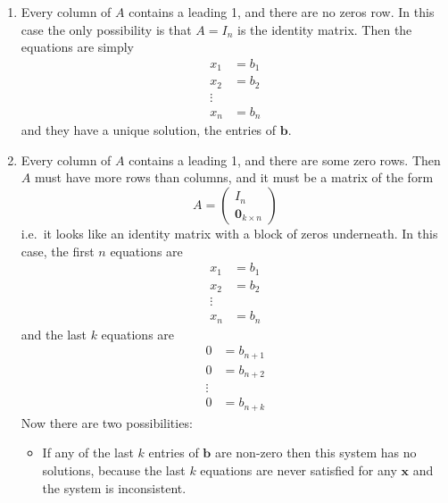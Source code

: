 \documentclass[12pt]{report}
\theoremstyle{definition}
\begin{document}
\begin{enumerate}[label = (\arabic*)]
    \item Every column of $A$ contains a leading 1, and there are no zeros row.
        In this case the only possibility is that $A = I_n$ is the identity matrix.
        Then the equations are simply\[
            \begin{align*}
                x_1 & = b_1 \\
                x_2 & = b_2 \\
                \vdots \\
                x_n & = b_n 
            \end{align*}
        \]
        and they have a unique solution, the entries of $\mathbf{b}$.

    \item Every column of $A$ contains a leading 1, and there are some zero rows.
        Then $A$ must have more rows than columns, and it must be a matrix of the form\[
            A = 
            \begin{pmatrix}
                  I_n \\
                  \mathbf{0}_{k \times n}
            \end{pmatrix} 
        \]
        i.e.\ it looks like an identity matrix with a block of zeros underneath.
        In this case, the first $n$ equations are\[
            \begin{align*}
                x_1 & = b_1 \\
                x_2 & = b_2 \\
                \vdots \\
                x_n & = b_n
            \end{align*}
        \]
        and the last $k$ equations are\[
            \begin{align*}
                0 & = b_{n + 1} \\
                0 & = b_{n + 2} \\
                \vdots \\
                0 & = b_{n + k}
            \end{align*}
        \]
        Now there are two possibilities:
        \begin{itemize}
                \item If any of the last $k$ entries of $\mathbf{b}$ are non-zero
                    then this system has no solutions, because the last $k$ equations
                    are never satisfied for any $\mathbf{x}$ and the system is inconsistent.


\end{itemize}
\end{enumerate}
\end{document}
